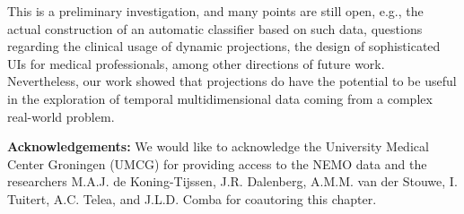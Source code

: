 This is a preliminary investigation, and many points are still open, e.g., the actual construction of an automatic classifier based on such data, questions regarding the clinical usage of dynamic projections, the design of sophisticated UIs for medical professionals, among other directions of future work. Nevertheless, our work showed that projections do have the potential to be useful in the exploration of temporal multidimensional data coming from a complex real-world problem.

\vspace{5mm} %

\noindent\textbf{Acknowledgements:} We would like to acknowledge the University Medical Center Groningen (UMCG) for providing access to the NEMO data and the researchers M.A.J. de Koning-Tijssen, J.R. Dalenberg, A.M.M. van der Stouwe, I. Tuitert, A.C. Telea, and J.L.D. Comba for coautoring this chapter.

